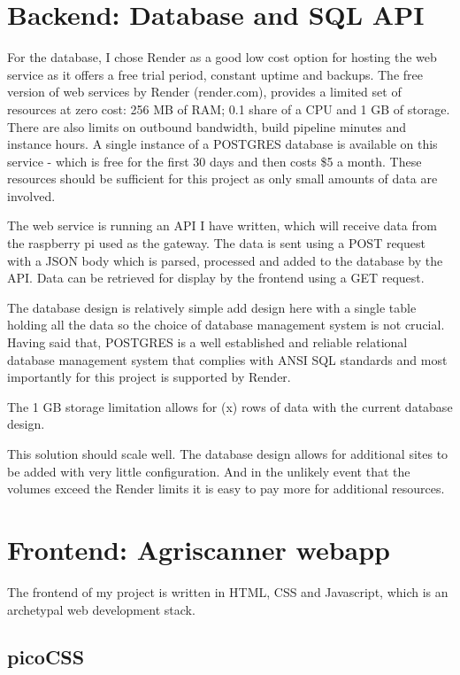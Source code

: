 \section{Backend: Database and SQL API}

For the database, I chose Render as a good low cost option for hosting the web
service as it offers a free trial period, constant uptime and backups. The free
version of web services by Render (render.com), provides a limited set of
resources at zero cost: 256 MB of RAM; 0.1 share of a CPU and 1 GB of storage.
There are also limits on outbound bandwidth, build pipeline minutes and instance
hours. A single instance of a POSTGRES database is available on this service -
which is free for the first 30 days and then costs \$5 a month. These resources
should be sufficient for this project as only small amounts of data are
involved.

The web service is running an API I have written, which will receive data from
the raspberry pi used as the gateway. The data is sent using a POST request with
a JSON body which is parsed, processed and added to the database by the API.
Data can be retrieved for display by the frontend using a GET request.

The database design is relatively simple  add design here with a single table
holding all the data so the choice of database management system is not crucial.
Having said that, POSTGRES is a well established and reliable relational
database management system that complies with ANSI SQL standards and most
importantly for this project is supported by Render.

The 1 GB storage limitation allows for (x) rows of data with the current
database design.

This solution should scale well. The database design allows for additional sites
to be added with very little configuration. And in the unlikely event that the
volumes exceed the Render limits it is easy to pay more for additional
resources.


\section{Frontend: Agriscanner webapp}

The frontend of my project is written in HTML, CSS and Javascript, which is an
archetypal web development stack.

\subsection{picoCSS}

